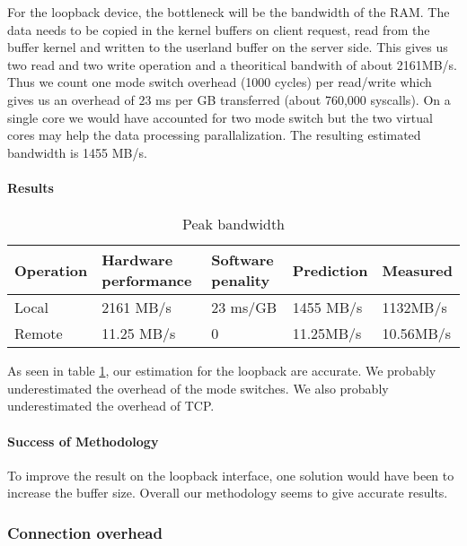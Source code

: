For the loopback device, the bottleneck will be the bandwidth of the RAM.
The data needs to be copied in the kernel buffers on client request, read from
the buffer kernel and written to the userland buffer on the server side.
This gives us two read and two write operation and a theoritical bandwith of
about 2161MB/s.
Thus we count one mode switch overhead (1000 cycles) per read/write which gives
us an overhead of 23 ms per GB transferred (about 760,000 syscalls).
On a single core we would have accounted for two mode switch but the two virtual
cores may help the data processing parallalization.
The resulting estimated bandwidth is 1455 MB/s.

\paragraph{Results}
\begin{table}[h]
\begin{center}
\begin{tabular}{| l | l | l | l | l |}
\hline
Operation & Hardware performance & Software penality & Prediction & Measured \\
\hline
Local 	&  2161 MB/s	& 23 ms/GB	&  1455 MB/s &  1132MB/s \\
\hline
Remote 	&  11.25 MB/s	& 0 &  11.25MB/s	&  10.56MB/s \\
\hline

\end{tabular}
\end{center}
\caption{Peak bandwidth\label{tab:peak-bandwidth}}
\end{table}

As seen in table \ref{tab:peak-bandwidth}, our estimation for the loopback are
accurate.
We probably underestimated the overhead of the mode switches.
We also probably underestimated the overhead of TCP.

\paragraph{Success of Methodology}
To improve the result on the loopback interface, one solution would have been to
increase the buffer size.
Overall our methodology seems to give accurate results.

\subsubsection{Connection overhead}
